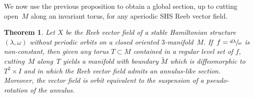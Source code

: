 \documentclass[11pt]{article}
\newcommand{\threemanifold}{$3$\nobreakdash-mani\-fold\xspace}
\newtheorem{theorem}{Theorem}[section]
\theoremstyle{definition}
\begin{document}
We now use the previous proposition to obtain a global section, up to cutting open~$M$ along an invariant torus, for any aperiodic SHS Reeb vector field.\enlargethispage{\baselineskip}%

\begin{theorem}\label{thm:SHSannulus}
Let $X$ be the Reeb vector field of a stable Hamiltonian structure $(\lambda,\omega)$ without periodic orbits on a closed oriented \threemanifold~$M$. If~$f=\sfrac{d\lambda}{\omega}$ is non-constant, then given any torus $T\subset M$ contained in a regular level set of $f$, cutting~$M$ along~$T$ yields a manifold with boundary $\widetilde M$ which is diffeomorphic to $T^2\times I$ and in which the Reeb vector field admits an annulus-like section. Moreover, the vector field is orbit equivalent to the suspension of a pseudo-rotation of the annulus.
\end{theorem}
\end{document}
